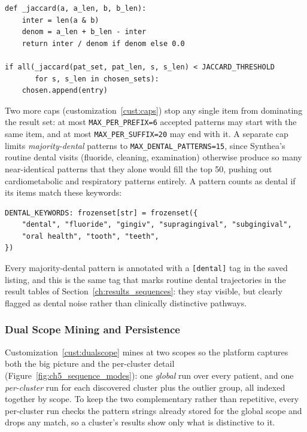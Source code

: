 \vspace{0.25cm}

\begin{lstlisting}[style=pythonstyle]
def _jaccard(a, a_len, b, b_len):
    inter = len(a & b)
    denom = a_len + b_len - inter
    return inter / denom if denom else 0.0

if all(_jaccard(pat_set, pat_len, s, s_len) < JACCARD_THRESHOLD
       for s, s_len in chosen_sets):
    chosen.append(entry)
\end{lstlisting}

Two more caps (customization~\ref{cust:caps}) stop any single item from dominating the result set: at most \texttt{MAX\_PER\_PREFIX=6} accepted patterns may start with the same item, and at most \texttt{MAX\_PER\_SUFFIX=20} may end with it. A separate cap limits \emph{majority-dental} patterns to \texttt{MAX\_DENTAL\_PATTERNS=15}, since Synthea's routine dental visits (fluoride, cleaning, examination) otherwise produce so many near-identical patterns that they alone would fill the top 50, pushing out cardiometabolic and respiratory patterns entirely. A pattern counts as dental if its items match these keywords:

\vspace{0.25cm}

\begin{lstlisting}[style=pythonstyle]
DENTAL_KEYWORDS: frozenset[str] = frozenset({
    "dental", "fluoride", "gingiv", "supragingival", "subgingival",
    "oral health", "tooth", "teeth",
})
\end{lstlisting}

\noindent Every majority-dental pattern is annotated with a \texttt{[dental]} tag in the saved listing, and this is the same tag that marks routine dental trajectories in the result tables of Section~\ref{ch:results_sequences}: they stay visible, but clearly flagged as dental noise rather than clinically distinctive pathways.

\subsubsection*{Dual Scope Mining and Persistence}

Customization~\ref{cust:dualscope} mines at two scopes so the platform captures both the big picture and the per-cluster detail (Figure~\ref{fig:ch5_sequence_modes}): one \emph{global} run over every patient, and one \emph{per-cluster} run for each discovered cluster plus the outlier group, all indexed together by scope. To keep the two complementary rather than repetitive, every per-cluster run checks the pattern strings already stored for the global scope and drops any match, so a cluster's results show only what is distinctive to it.

